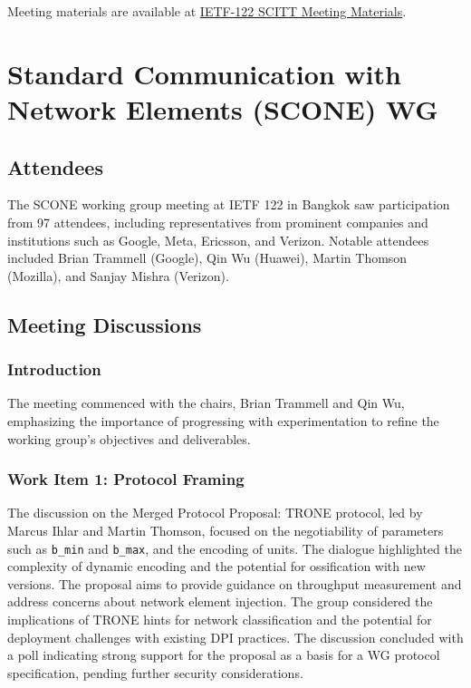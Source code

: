 \documentclass{article}
\begin{document}
Meeting materials are available at \href{https://www.ietf.org/proceedings/122/scitt.html}{IETF-122 SCITT Meeting Materials}.



\newpage

\section{Standard Communication with Network Elements (SCONE) WG}

\subsection{Attendees}

The SCONE working group meeting at IETF 122 in Bangkok saw participation from 97 attendees, including representatives from prominent companies and institutions such as Google, Meta, Ericsson, and Verizon. Notable attendees included Brian Trammell (Google), Qin Wu (Huawei), Martin Thomson (Mozilla), and Sanjay Mishra (Verizon).

\subsection{Meeting Discussions}

\subsubsection{Introduction}

The meeting commenced with the chairs, Brian Trammell and Qin Wu, emphasizing the importance of progressing with experimentation to refine the working group's objectives and deliverables.

\subsubsection{Work Item 1: Protocol Framing}

The discussion on the Merged Protocol Proposal: TRONE protocol, led by Marcus Ihlar and Martin Thomson, focused on the negotiability of parameters such as \texttt{b\_min} and \texttt{b\_max}, and the encoding of units. The dialogue highlighted the complexity of dynamic encoding and the potential for ossification with new versions. The proposal aims to provide guidance on throughput measurement and address concerns about network element injection. The group considered the implications of TRONE hints for network classification and the potential for deployment challenges with existing DPI practices. The discussion concluded with a poll indicating strong support for the proposal as a basis for a WG protocol specification, pending further security considerations.
\end{document}
